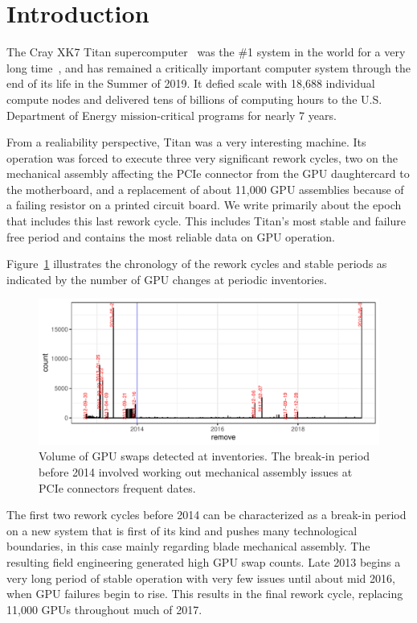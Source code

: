 \section{Introduction}
\label{section:introduction}

The Cray XK7 Titan supercomputer~\cite{olcf:titan} was the \#1 system in the world for a
very long time~\cite{top500list}, and has remained a critically important computer
system through the end of its life in the Summer of 2019. It defied
scale with 18,688 individual compute nodes and delivered tens of
billions of computing hours to the U.S. Department of Energy
mission-critical programs for nearly 7 years.
 
From a realiability perspective, Titan was a very interesting
machine. Its operation was forced to execute three very significant
rework cycles, two on the mechanical assembly affecting the PCIe
connector from the GPU daughtercard to the motherboard, and a
replacement of about 11,000 GPU assemblies because of a failing
resistor on a printed circuit board. We write primarily about the epoch
that includes this last rework cycle. This includes Titan's most
stable and failure free period and contains the most reliable data on
GPU operation.

Figure~\ref{fig:chronology} illustrates the chronology of the rework
cycles and stable periods as indicated by the number of GPU changes at
periodic inventories.
\begin{figure}[tbp]
  \centering
  \includegraphics[width=\textwidth]{figs/chronology001.pdf}
  \caption{Volume of GPU swaps detected at inventories. The break-in
    period before 2014 involved working out mechanical assembly issues
    at PCIe connectors
    frequent dates.}
  \label{fig:chronology}
\end{figure}
The first two rework cycles before 2014 can be characterized as a
break-in period on a new system that is first of its kind and pushes
many technological boundaries, in this case mainly regarding blade
mechanical assembly. The resulting field engineering generated high
GPU swap counts. Late 2013 begins a very long period of stable
operation with very few issues until about mid 2016, when GPU failures
begin to rise. This results in the final rework cycle, replacing
11,000 GPUs throughout much of 2017.

